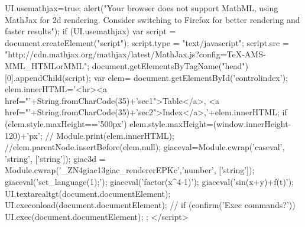 {{{{     UI.usemathjax=true;
     alert("Your browser does not support MathML, using MathJax for 2d rendering. Consider switching to Firefox for better rendering and faster results");
  }
  if (UI.usemathjax){
    var script = document.createElement("script");
    script.type = "text/javascript";
    script.src  = "http://cdn.mathjax.org/mathjax/latest/MathJax.js?config=TeX-AMS-MML_HTMLorMML";
    document.getElementsByTagName("head")[0].appendChild(script);
  }
  var elem= document.getElementById('controlindex');
  elem.innerHTML='<hr><a href="'+String.fromCharCode(35)+'sec1">Table</a>, <a href="'+String.fromCharCode(35)+'sec2">Index</a>,'+elem.innerHTML;
  if (elem.style.maxHeight=='500px')
    elem.style.maxHeight=(window.innerHeight-120)+'px';
  // Module.print(elem.innerHTML);
  //elem.parentNode.insertBefore(elem,null);
  giaceval=Module.cwrap('caseval',  'string', ['string']);
  giac3d = Module.cwrap('_ZN4giac13giac_rendererEPKc','number', ['string']);
  giaceval('set_language(1);');
  giaceval('factor(x^4-1)');
  giaceval('sin(x+y)+f(t)');
  UI.textarealtgt(document.documentElement);
  UI.execonload(document.documentElement);
 // if (confirm('Exec commands?')) UI.exec(document.documentElement);
 };
</script>
}
\fi
}
\ifhevea
\newenvironment{giacprog}{
\verbatim}
{\endverbatim 
\@print{<button onclick="var field=parentNode.previousSibling; var tmp=field.innerHTML;if(tmp.length==0) tmp=field.value;var t=createElement('TEXTAREA');t.style.fontSize=16;t.cols=60;t.rows=10;var tmp1=UI.ltgt(tmp);t.value=tmp1;tmp=UI.caseval(tmp);tmp=UI.rmquote(tmp);nextSibling.innerHTML=tmp; UI.render_canvas(nextSibling.innerHTML); field.parentNode.insertBefore(t,field);field.parentNode.removeChild(field);">ok</button><span></span><br>
}
}
\newenvironment{giaconload}{
\verbatim}
{\endverbatim 
\@print{<button onclick="var field=parentNode.previousSibling; var tmp=field.innerHTML;if(tmp.length==0) tmp=field.value;var t=createElement('TEXTAREA');t.style.fontSize=16;t.cols=60;t.rows=10;var tmp1=UI.ltgt(tmp);t.value=tmp1;tmp=UI.caseval(tmp);tmp=UI.rmquote(tmp);nextSibling.innerHTML=tmp; UI.render_canvas(nextSibling.innerHTML); field.parentNode.insertBefore(t,field);field.parentNode.removeChild(field);">ok</button><span>onload</span><br>
}
}
\else
\newenvironment{giacprog}
{
\VerbatimEnvironment
\begin{Verbatim}
}
{
\end{Verbatim}
}
\newenvironment{giaconload}
{
\VerbatimEnvironment
\begin{Verbatim}
}
{
\end{Verbatim}
}
\fi

